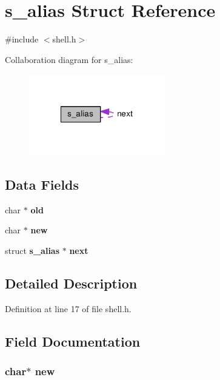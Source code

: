 \section{s\-\_\-alias Struct Reference}
\label{structs__alias}


{\ttfamily \#include $<$shell.\-h$>$}



Collaboration diagram for s\-\_\-alias\-:\nopagebreak
\begin{figure}[H]
\begin{center}
\leavevmode
\includegraphics[width=168pt]{structs__alias__coll__graph}
\end{center}
\end{figure}
\subsection*{Data Fields}
\begin{DoxyCompactItemize}
\item 
char $\ast$ {\bf old}
\item 
char $\ast$ {\bf new}
\item 
struct {\bf s\-\_\-alias} $\ast$ {\bf next}
\end{DoxyCompactItemize}


\subsection{Detailed Description}


Definition at line 17 of file shell.\-h.



\subsection{Field Documentation}
\subsubsection[{new}]{\setlength{\rightskip}{0pt plus 5cm}char$\ast$ new}\label{structs__alias_a80de185e58c66866a3e560697b9fb978}


